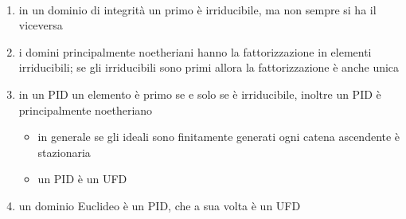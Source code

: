 \begin{osservazione}
	\
	\begin{enumerate}
		\item in un dominio di integrità un primo è irriducibile, ma non sempre si ha il viceversa
		\item i domini principalmente noetheriani hanno la fattorizzazione in elementi irriducibili; se gli irriducibili sono primi allora la fattorizzazione è anche unica
		\item in un PID un elemento è primo se e solo se è irriducibile, inoltre un PID è principalmente noetheriano 
		\begin{itemize}
			\item in generale se gli ideali sono finitamente generati ogni catena ascendente è stazionaria
			\item un PID è un UFD
		\end{itemize}
	\item un dominio Euclideo è un PID, che a sua volta è un UFD
	\end{enumerate}
\end{osservazione}
